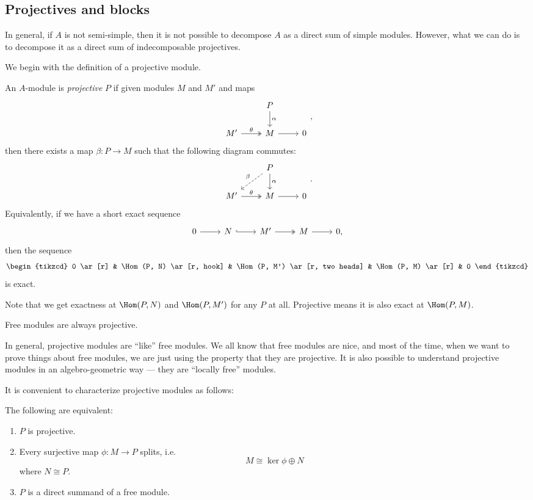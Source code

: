 \documentclass[a4paper]{article}
\begin{document}
\subsection{Projectives and blocks}
In general, if $A$ is not semi-simple, then it is not possible to decompose $A$ as a direct sum of simple modules. However, what we can do is to decompose it as a direct sum of indecomposable projectives.

We begin with the definition of a projective module.

\begin{defi}
  An $A$-module is \emph{projective} $P$ if given modules $M$ and $M'$ and maps
  \[
    \begin{tikzcd}
      & P \ar[d, "\alpha"]\\
      M' \ar[r, two heads, "\theta"] & M \ar[r] & 0
    \end{tikzcd},
  \]
  then there exists a map $\beta: P \to M$ such that the following diagram commutes:
  \[
    \begin{tikzcd}
      & P \ar[d, "\alpha"] \ar[ld, dashed, "\beta"']\\
      M' \ar[r, two heads, "\theta"] & M \ar[r] & 0
    \end{tikzcd}.
  \]
  Equivalently, if we have a short exact sequence
  \[
    \begin{tikzcd}
      0 \ar[r] & N \ar[r, hook] & M' \ar[r, two heads] & M \ar[r] & 0,
    \end{tikzcd}
  \]
  then the sequence
  \[
    \begin{tikzcd}
      0 \ar[r] & \Hom(P, N) \ar[r, hook] & \Hom(P, M') \ar[r, two heads] & \Hom(P, M) \ar[r] & 0
    \end{tikzcd}
  \]
  is exact.
\end{defi}
Note that we get exactness at $\Hom(P, N)$ and $\Hom(P, M')$ for any $P$ at all. Projective means it is also exact at $\Hom(P, M)$.

\begin{eg}
  Free modules are always projective.
\end{eg}
In general, projective modules are ``like'' free modules. We all know that free modules are nice, and most of the time, when we want to prove things about free modules, we are just using the property that they are projective. It is also possible to understand projective modules in an algebro-geometric way --- they are ``locally free'' modules.

It is convenient to characterize projective modules as follows:
\begin{lemma}
  The following are equivalent:
  \begin{enumerate}
    \item $P$ is projective.
    \item Every surjective map $\phi: M \to P$ splits, i.e.
      \[
        M \cong \ker \phi \oplus N
      \]
      where $N \cong P$.
    \item $P$ is a direct summand of a free module.
  \end{enumerate}
\end{lemma}
\end{document}
